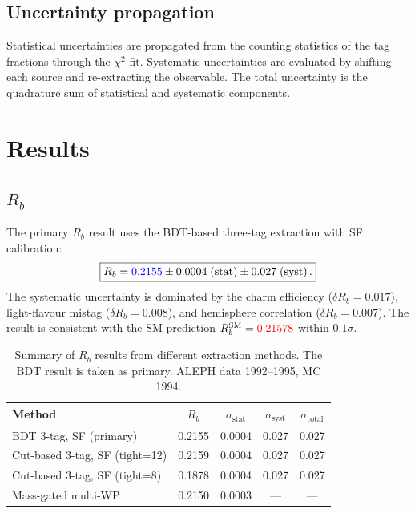 \documentclass[11pt,a4paper]{article}
\newcommand{\measured}[1]{\textcolor{blue}{#1}}
\newcommand{\external}[1]{\textcolor{red}{#1}}
\begin{document}
\subsection{Uncertainty propagation}

Statistical uncertainties are propagated from the counting statistics of
the tag fractions through the $\chi^2$ fit.  Systematic uncertainties are
evaluated by shifting each source and re-extracting the observable.  The
total uncertainty is the quadrature sum of statistical and systematic
components.

\section{Results}
\label{sec:results}

\subsection{$R_b$}

The primary $R_b$ result uses the BDT-based three-tag extraction with
SF calibration:
\begin{equation}
\boxed{
  R_b = \measured{0.2155} \pm 0.0004\;\mathrm{(stat)} \pm
  0.027\;\mathrm{(syst)}\,.
}
\label{eq:rb-result}
\end{equation}
The systematic uncertainty is dominated by the charm efficiency
($\delta R_b = 0.017$), light-flavour mistag ($\delta R_b = 0.008$),
and hemisphere correlation ($\delta R_b = 0.007$).  The result is
consistent with the SM prediction $R_b^\mathrm{SM} = \external{0.21578}$
within $0.1\sigma$.

\begin{table}[htbp]
\centering
\caption{Summary of $R_b$ results from different extraction methods.
  The BDT result is taken as primary.  ALEPH data 1992--1995, MC 1994.}
\label{tbl:rb-results}
\begin{tabular}{lcccc}
\toprule
Method & $R_b$ & $\sigma_\mathrm{stat}$ & $\sigma_\mathrm{syst}$ & $\sigma_\mathrm{total}$ \\
\midrule
BDT 3-tag, SF (primary) & 0.2155 & 0.0004 & 0.027 & 0.027 \\
Cut-based 3-tag, SF (tight=12) & 0.2159 & 0.0004 & 0.027 & 0.027 \\
Cut-based 3-tag, SF (tight=8) & 0.1878 & 0.0004 & 0.027 & 0.027 \\
Mass-gated multi-WP & 0.2150 & 0.0003 & --- & --- \\
\bottomrule
\end{tabular}
\end{table}
\end{document}
